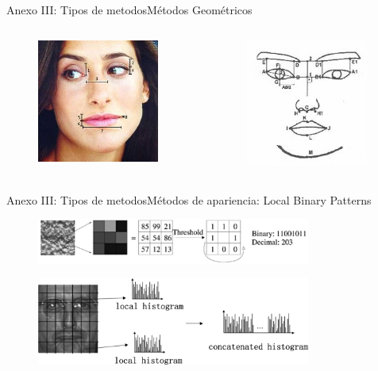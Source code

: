 \documentclass{beamer}
\begin{document}
	\begin{frame}{Anexo III: Tipos de metodos}{Métodos Geométricos}
		\begin{columns}[onlytextwidth]
			\begin{column}{0.5\textwidth}
				\begin{figure}[bt]
					\centering
					\includegraphics[width=4cm]{imagenes/geo1.jpg}
				\end{figure}	
			\end{column}
			\begin{column}{0.5\textwidth}
				\begin{figure}[bt]
					\centering
					\includegraphics[width=4cm]{imagenes/geo2.jpg}
				\end{figure}	
			\end{column}
		\end{columns}      			
	\end{frame}
	
	\begin{frame}{Anexo III: Tipos de metodos}{Métodos de apariencia: Local Binary Patterns}
		\begin{figure}[bt]
			\centering
			\includegraphics[width=9cm]{imagenes/lbp.pdf}
		\end{figure}	
		
		\begin{figure}[bt]
			\centering
			\includegraphics[width=9cm]{imagenes/lbp_histogram.png}
		\end{figure}	  
	\end{frame}
	
\end{document}
